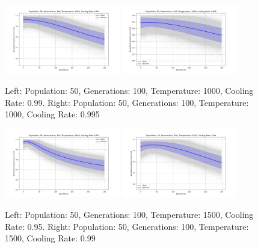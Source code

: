 \documentclass{article}
\begin{document}
    \begin{figure}[H]
        \centering
        \includegraphics[width=0.45\textwidth]{genetic_simulated_annealing_hybrid/appendix/Population_50_Generations_100_Temperature_1000_CoolingRate_0.99.png}
        \includegraphics[width=0.45\textwidth]{genetic_simulated_annealing_hybrid/appendix/Population_50_Generations_100_Temperature_1000_CoolingRate_0.995.png}
        \caption{Left: Population: 50, Generations: 100, Temperature: 1000, Cooling Rate: 0.99. Right: Population: 50, Generations: 100, Temperature: 1000, Cooling Rate: 0.995}
        \label{fig:app_ga_50_100_1000_99_995}
    \end{figure}

    \begin{figure}[H]
        \centering
        \includegraphics[width=0.45\textwidth]{genetic_simulated_annealing_hybrid/appendix/Population_50_Generations_100_Temperature_1500_CoolingRate_0.95.png}
        \includegraphics[width=0.45\textwidth]{genetic_simulated_annealing_hybrid/appendix/Population_50_Generations_100_Temperature_1500_CoolingRate_0.99.png}
        \caption{Left: Population: 50, Generations: 100, Temperature: 1500, Cooling Rate: 0.95. Right: Population: 50, Generations: 100, Temperature: 1500, Cooling Rate: 0.99}
        \label{fig:app_ga_50_100_1500_95_99}
    \end{figure}
\end{document}
